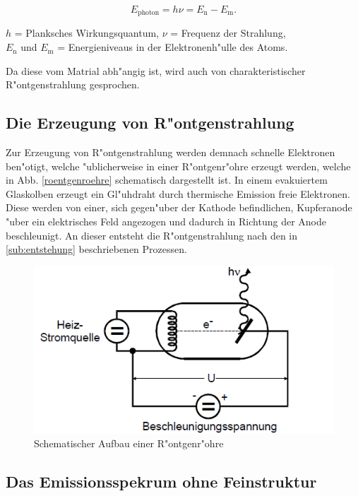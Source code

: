 		\begin{equation}
			E_{\text{photon}} = h \nu = E_\mathrm{n} - E_\mathrm{m}. \label{gleich_1}
		\end{equation}
		\begin{center}
			$h$ = Planksches Wirkungsquantum, $\nu$ = Frequenz der Strahlung,\\
			$E_\mathrm{n}$ und $E_\mathrm{m}$ = Energieniveaus in der Elektronenh"ulle des Atoms.
		\end{center}
	
		{Da diese vom Matrial abh"angig ist, wird auch von charakteristischer R"ontgenstrahlung gesprochen.}
		
	\subsection{Die Erzeugung von R"ontgenstrahlung}
	\label{sub:erzeugung}

		Zur Erzeugung von R"ontgenstrahlung werden demnach schnelle Elektronen ben"otigt, welche "ublicherweise in einer R"ontgenr"ohre erzeugt werden, welche in Abb. \eqref{roentgenroehre} schematisch dargestellt ist.
		In einem evakuiertem Glaskolben erzeugt ein Gl"uhdraht durch thermische Emission freie Elektronen. 
		Diese werden von einer, sich gegen"uber der Kathode be\-find\-lich\-en, Kupferanode "uber ein elektrisches Feld angezogen und dadurch in Richtung der Anode beschleunigt.
		An dieser entsteht die R"ontgenstrahlung nach den in \eqref{sub:entstehung} beschriebenen Prozessen.

		\begin{figure}[htbp]
			\centering
			\includegraphics[width = 12cm]{img/Roentgenroehre.png}
			\caption{Schematischer Aufbau einer R"ontgenr"ohre \cite{anleitung}}
			\label{roentgenroehre}
		\end{figure}

	\subsection{Das Emissionsspekrum ohne Feinstruktur}
	\label{sub:ohnefein}

